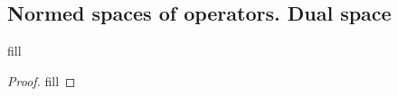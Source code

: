 \subsection{Normed spaces of operators. Dual space}

\begin{exercise}{1}
fill
\end{exercise}
\begin{proof}
fill
\end{proof}